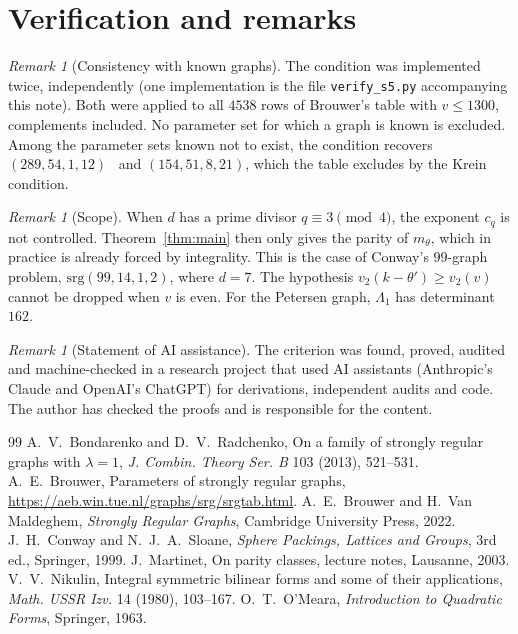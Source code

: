 \documentclass[11pt]{amsart}
\theoremstyle{remark}
\newtheorem{remark}[theorem]{Remark}
\begin{document}
\section{Verification and remarks}
\begin{remark}[Consistency with known graphs]
The condition was implemented twice, independently (one implementation is the file \texttt{verify\_s5.py} accompanying
this note). Both were applied to all $4538$ rows of Brouwer's table with $v\le1300$, complements included. No parameter set
for which a graph is known is excluded. Among the parameter sets known not to exist, the condition recovers
$(289,54,1,12)$~\cite{BR} and $(154,51,8,21)$, which the table excludes by the Krein condition.
\end{remark}

\begin{remark}[Scope]
When $d$ has a prime divisor $q\equiv3\pmod4$, the exponent $c_q$ is not controlled. Theorem~\ref{thm:main} then only
gives the parity of $m_\theta$, which in practice is already forced by integrality. This is the case of Conway's
$99$-graph problem, $\mathrm{srg}(99,14,1,2)$, where $d=7$. The hypothesis $v_2(k-\theta')\ge v_2(v)$ cannot be dropped
when $v$ is even. For the Petersen graph, $\Lambda_1$ has determinant $162$.
\end{remark}

\begin{remark}[Statement of AI assistance]
The criterion was found, proved, audited and machine-checked in a research project that used AI assistants (Anthropic's
Claude and OpenAI's ChatGPT) for derivations, independent audits and code. The author has checked the proofs and is
responsible for the content.
\end{remark}

\begin{thebibliography}{99}
 A.~V.~Bondarenko and D.~V.~Radchenko, On a family of strongly regular graphs with $\lambda=1$,
\emph{J. Combin. Theory Ser. B} 103 (2013), 521--531.
 A.~E.~Brouwer, Parameters of strongly regular graphs, \url{https://aeb.win.tue.nl/graphs/srg/srgtab.html}.
 A.~E.~Brouwer and H.~Van Maldeghem, \emph{Strongly Regular Graphs}, Cambridge University Press, 2022.
 J.~H.~Conway and N.~J.~A.~Sloane, \emph{Sphere Packings, Lattices and Groups}, 3rd ed., Springer, 1999.
 J.~Martinet, On parity classes, lecture notes, Lausanne, 2003.
 V.~V.~Nikulin, Integral symmetric bilinear forms and some of their applications,
\emph{Math. USSR Izv.} 14 (1980), 103--167.
 O.~T.~O'Meara, \emph{Introduction to Quadratic Forms}, Springer, 1963.
\end{thebibliography}
\end{document}
